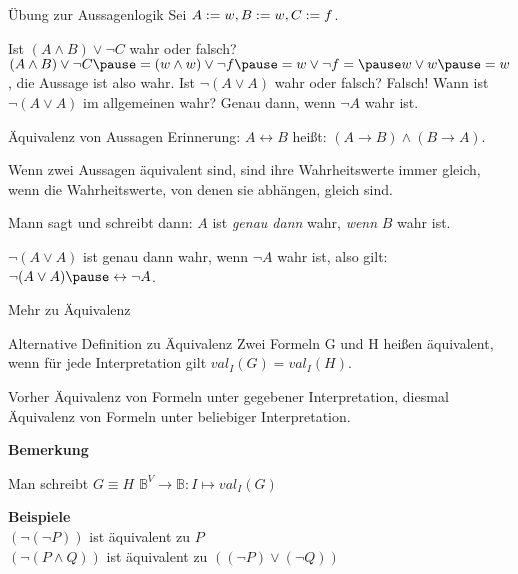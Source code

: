 \documentclass[]{beamer}
\begin{document}
\begin{frame}{Übung zur Aussagenlogik}
	\pause Sei $A := w, B := w, C := f$.
	
	\begin{itemize}
		\pitem Ist $(A \land B) \lor \lnot C$ wahr oder falsch? \pause $(A \land B) \lor \lnot C \pause = (\W \land \W) \lor \lnot \F \pause = \W \lor \lnot \F = \pause \W \lor \W \pause = \W$\pause , die Aussage ist also wahr.
		\pitem Ist $\lnot (A \lor A)$ wahr oder falsch? \pause Falsch! \pause Wann ist $\lnot (A \lor A)$ im allgemeinen wahr? \pause Genau dann, wenn $\lnot A$ wahr ist.
	\end{itemize}

	\pause

	\begin{block}{Äquivalenz von Aussagen}
		Erinnerung: \pause $A \leftrightarrow B$ heißt: \pause $(A \rightarrow B) \land (B \rightarrow A)$. 
		
		\pause Wenn zwei Aussagen äquivalent sind, sind ihre Wahrheitswerte immer gleich\pause , wenn die Wahrheitswerte, von denen sie abhängen, gleich sind. 
		
		\pause Mann sagt und schreibt dann: \pause $A$ ist \emph{genau dann} wahr, \emph{wenn} $B$ wahr ist.
	\end{block}

	\begin{itemize}
		\pitem $\lnot (A \lor A)$ ist genau dann wahr\pause , wenn $\lnot A$ wahr ist\pause , also gilt:  $\lnot (A \lor A) \pause \leftrightarrow \lnot A$. 
	\end{itemize}
\end{frame}

\begin{frame}{Mehr zu Äquivalenz}
\pause
	\begin{block}{Alternative Definition zu Äquivalenz}
		Zwei Formeln G und H heißen äquivalent, wenn für jede Interpretation gilt $val_I(G) = val_I(H)$.
	\end{block}\pause

	Vorher Äquivalenz von Formeln unter gegebener Interpretation\pause , diesmal Äquivalenz von Formeln unter beliebiger Interpretation.\pause

	\textbf{Bemerkung}\\
	\begin{itemize}
		\pitem Man schreibt $G \equiv  H$
		\pitem $\mathbb{B}^V \rightarrow \mathbb{B}: I \mapsto val_I(G)$
	\end{itemize}\pause
	\textbf{Beispiele}\\\pause
	$(\lnot(\lnot P))$ ist äquivalent zu $P$\\\pause
	$(\lnot(P\land Q))$ ist äquivalent zu $((\lnot P) \lor (\lnot Q))$
\end{frame}
\end{document}
